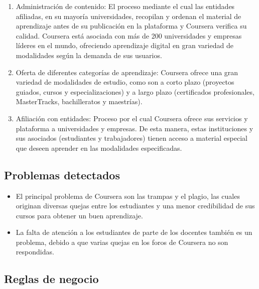 \documentclass[../main.tex]{subfiles}
\begin{document}
\begin{enumerate}
  \item Administración de contenido: \newline
        El proceso mediante el cual las entidades afiliadas,
        en su mayoría universidades, recopilan y ordenan el
        material de aprendizaje antes de su publicación en
        la plataforma y Coursera verifica su calidad. Coursera
        está asociada con más de 200 universidades y empresas
        líderes en el mundo, ofreciendo aprendizaje digital
        en gran variedad de modalidades según la demanda de
        sus usuarios.
  \item Oferta de diferentes categorías de aprendizaje: \newline
        Coursera ofrece una gran variedad de modalidades de
        estudio, como son a corto plazo (proyectos guiados,
        cursos y especializaciones) y a largo plazo (certificados
        profesionales, MasterTracks, bachilleratos y maestrías).
  \item Afiliación con entidades: \newline
        Proceso por el cual Coursera ofrece sus servicios y
        plataforma a universidades y empresas. De esta manera,
        estas instituciones y sus asociados (estudiantes y
        trabajadores) tienen acceso a material especial que
        deseen aprender en las modalidades especificadas.
\end{enumerate}

\subsection{Problemas detectados}

\begin{itemize}
  \item El principal problema de Coursera son las trampas y el
        plagio, las cuales originan diversas quejas entre los
        estudiantes y una menor credibilidad de sus cursos para
        obtener un buen aprendizaje.
  \item La falta de atención a los estudiantes de parte de los
        docentes también es un problema, debido a que varias
        quejas en los foros de Coursera no son respondidas.
\end{itemize}

\subsection{Reglas de negocio}
\end{document}
